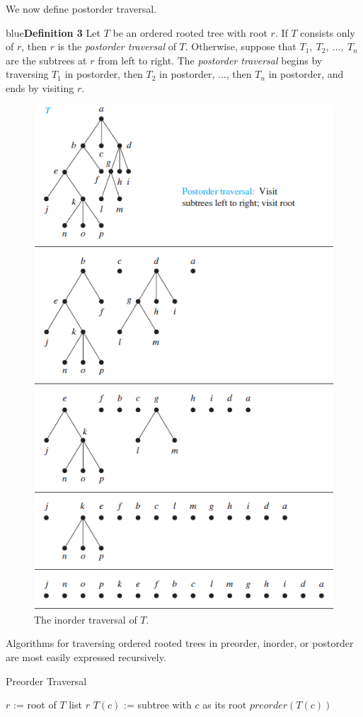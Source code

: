 \documentclass{article}
\begin{document}
We now define postorder traversal.

\begin{mybox}{blue}{\textbf{Definition 3}}
Let $T$ be an ordered rooted tree with root $r$. If $T$ consists only of $r$, then $r$ is the \textit{postorder traversal} of $T$. Otherwise, suppose that $T_1,\ T_2,\ ...,\ T_n$ are the subtrees at $r$ from left to right. The \textit{postorder traversal} begins by traversing $T_1$ in postorder, then $T_2$ in postorder, ..., then $T_n$ in postorder, and ends by visiting $r$.
\end{mybox}

\begin{figure}[h!]
    \centering
    \includegraphics[width=.65\textwidth]{img/ch11.3-figure8.png}
    \caption{The inorder traversal of $T$.}
    \label{fig:my_label}
\end{figure}


Algorithms for traversing ordered rooted trees in preorder, inorder, or postorder are most easily expressed recursively.

\begin{algorithm}
\caption{Preorder Traversal}
\begin{algorithmic}[1]
\State $r$ := root of $T$
\State list $r$
\State $T(c)$ := subtree with $c$ as its root
\State $preorder(T(c))$
\EndFor
\EndProcedure
\end{algorithmic}
\end{algorithm}
\end{document}
